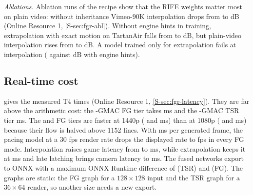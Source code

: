 \documentclass[pdflatex,sn-mathphys-num,iicol]{sn-jnl}
\begin{document}
\emph{Ablations.} Ablation runs of the  recipe show that the RIFE weights matter most on plain video: without inheritance Vimeo-90K interpolation drops from  to  dB (Online Resource 1, \cref{S-sec:fgr-abl}). Without engine hints in training, extrapolation with exact motion on TartanAir falls from  to  dB, but plain-video interpolation rises from  to  dB. A model trained only for extrapolation fails at interpolation ( against  dB with engine hints).

\subsection{Real-time cost}\label{sec:res-time}

 gives the measured T4 times (Online Resource 1, \cref{S-sec:fgr-latency}). They are far above the arithmetic cost: the -GMAC FG  tier takes  ms and the -GMAC TSR  tier  ms. The  and  FG tiers are faster at 1440p ( and  ms) than at 1080p ( and  ms) because their flow is halved above 1152 lines. With  ms per generated frame, the pacing model at a 30 fps render rate drops the displayed rate to  fps in every FG mode. Interpolation raises game latency from  to  ms, while extrapolation keeps it at  ms and late latching brings camera latency to  ms. The fused networks export to ONNX with a maximum ONNX Runtime difference of  (TSR) and  (FG). The graphs are static: the FG graph for a $128\times128$ input and the TSR graph for a $36\times64$ render, so another size needs a new export.
\end{document}
